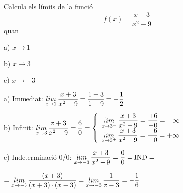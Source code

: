 \begin{resolt}[E]{Calcula els límits  de la funció 
	\begin{equation*}
		f(x)=\dfrac{x+3}{x^{2} -9}
	\end{equation*}
quan \vspace{0.25cm}

\quad a) $x\rightarrow 1$

\quad b) $x\rightarrow 3$

\quad c) $x\rightarrow -3$
}

 a) Immediat: 
  $\mathop{lim}\limits_{x\to 1} \dfrac{x+3}{x^{2} -9} = \dfrac{1+3}{1-9} = - \dfrac{1}{2} $ \vspace{0.75cm}
 
 b) Infinit:  $\mathop{lim}\limits_{x\to 3} \dfrac{x+3}{x^{2} -9} = \dfrac{6}{0} = \left\{ \begin{array}{l} 
 	 \mathop{lim}\limits_{x\to 3^-} \dfrac{x+3}{x^{2} -9}  = \dfrac{+6}{-0} = -\infty \\  \mathop{lim}\limits_{x\to 3^+} \dfrac{x+3}{x^{2} -9}  = \dfrac{+6}{+0} = +\infty
 \end{array} \right.$ \vspace{0.75cm}
	
 c) Indeterminació 0/0:
  $\mathop{lim}\limits_{x\to -3} \dfrac{x+3}{x^{2} -9} = \dfrac{0}{0} = \mathrm{IND}=$\par \qquad   $=\mathop{lim}\limits_{x\to -3} \dfrac{(x+3)}{(x+3)\cdot (x-3)}= \mathop{lim}\limits_{x\to -3} \dfrac{1}{x-3}= -\dfrac{1}{6} $ 
 
 
\end{resolt}







